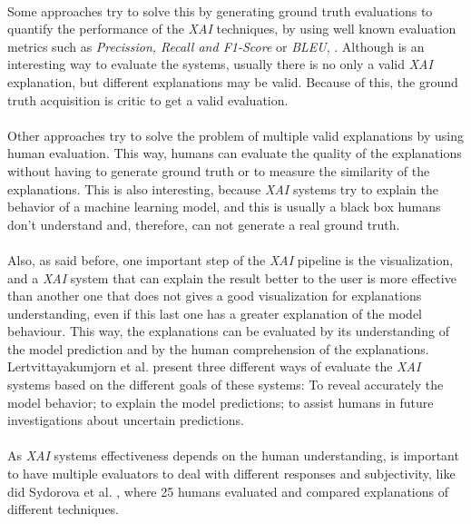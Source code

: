 \paragraph{}
Some approaches try to solve this by generating ground truth evaluations to quantify the performance of the \emph{XAI} techniques, by using well known evaluation metrics such as \emph{Precission, Recall and F1-Score}\cite{Carton2018} or \emph{BLEU}\cite{Ling2017}, \cite{Rajani2019}. Although is an interesting way to evaluate the systems, usually there is no only a valid \emph{XAI} explanation, but different explanations may be valid. Because of this, the ground truth acquisition is critic to get a valid evaluation.
\paragraph{}
Other approaches try to solve the problem of multiple valid explanations by using human evaluation. This way, humans can evaluate the quality of the explanations without having to generate ground truth or to measure the similarity of the explanations. This is also interesting, because \emph{XAI} systems try to explain the behavior of a machine learning model, and this is usually a black box humans don't understand and, therefore, can not generate a real ground truth. 
\paragraph{}
Also, as said before, one important step of the \emph{XAI} pipeline is the visualization, and a \emph{XAI} system that can explain the result better to the user is more effective than another one that does not gives a good visualization for explanations understanding, even if this last one has a greater explanation of the model behaviour. This way, the explanations can be evaluated by its understanding of the model prediction and by the human comprehension of the explanations. Lertvittayakumjorn et al. \cite{Lertvittayakumjorn2019} present three different ways of evaluate the \emph{XAI} systems based on the different goals of these systems: To reveal accurately the model behavior; to explain the model predictions; to assist humans in future investigations about uncertain predictions.
\paragraph{}
As \emph{XAI} systems effectiveness depends on the human understanding, is important to have multiple evaluators to deal with different responses and subjectivity, like did Sydorova et al. \cite{Sydorova2019}, where 25 humans evaluated and compared explanations of different techniques.
